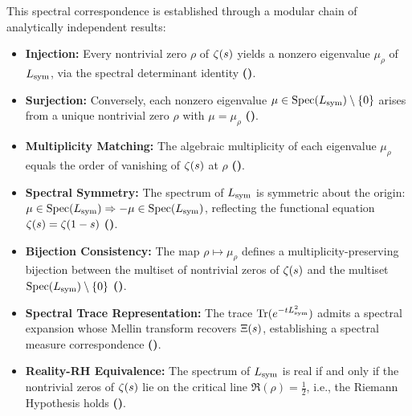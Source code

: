 \medskip
\noindent
This spectral correspondence is established through a modular chain of analytically independent results:

\begin{itemize}
  \item \textbf{Injection:} Every nontrivial zero \(\rho\) of \(\zeta(s)\) yields a nonzero eigenvalue \(\mu_\rho\) of \(L_{\mathrm{sym}}\), via the spectral determinant identity \textbf{()}.
  
  \item \textbf{Surjection:} Conversely, each nonzero eigenvalue \(\mu \in \operatorname{Spec}(L_{\mathrm{sym}}) \setminus \{0\}\) arises from a unique nontrivial zero \(\rho\) with \(\mu = \mu_\rho\) \textbf{()}.
  
  \item \textbf{Multiplicity Matching:} The algebraic multiplicity of each eigenvalue \(\mu_\rho\) equals the order of vanishing of \(\zeta(s)\) at \(\rho\) \textbf{()}.
  
  \item \textbf{Spectral Symmetry:} The spectrum of \(L_{\mathrm{sym}}\) is symmetric about the origin: \(\mu \in \operatorname{Spec}(L_{\mathrm{sym}}) \Rightarrow -\mu \in \operatorname{Spec}(L_{\mathrm{sym}})\), reflecting the functional equation \(\zeta(s) = \zeta(1 - s)\) \textbf{()}.
  
  \item \textbf{Bijection Consistency:} The map \(\rho \mapsto \mu_\rho\) defines a multiplicity-preserving bijection between the multiset of nontrivial zeros of \(\zeta(s)\) and the multiset \(\operatorname{Spec}(L_{\mathrm{sym}}) \setminus \{0\}\) \textbf{()}.
  
  \item \textbf{Spectral Trace Representation:} The trace \(\operatorname{Tr}(e^{-t L_{\mathrm{sym}}^2})\) admits a spectral expansion whose Mellin transform recovers \(\Xi(s)\), establishing a spectral measure correspondence \textbf{()}.
  
  \item \textbf{Reality-RH Equivalence:} The spectrum of \(L_{\mathrm{sym}}\) is real if and only if the nontrivial zeros of \(\zeta(s)\) lie on the critical line \(\Re(\rho) = \tfrac{1}{2}\), i.e., the Riemann Hypothesis holds \textbf{()}.
\end{itemize}

